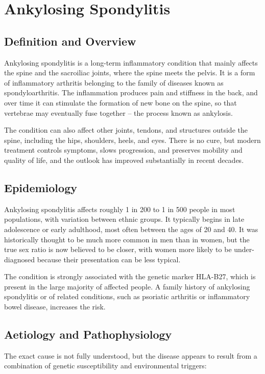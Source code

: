 \chapter{Ankylosing Spondylitis}

\section*{Definition and Overview}
Ankylosing spondylitis is a long-term inflammatory condition that mainly affects the spine and the sacroiliac joints, where the spine meets the pelvis. It is a form of inflammatory arthritis belonging to the family of diseases known as spondyloarthritis. The inflammation produces pain and stiffness in the back, and over time it can stimulate the formation of new bone on the spine, so that vertebrae may eventually fuse together -- the process known as ankylosis.

The condition can also affect other joints, tendons, and structures outside the spine, including the hips, shoulders, heels, and eyes. There is no cure, but modern treatment controls symptoms, slows progression, and preserves mobility and quality of life, and the outlook has improved substantially in recent decades.

\section*{Epidemiology}
Ankylosing spondylitis affects roughly 1 in 200 to 1 in 500 people in most populations, with variation between ethnic groups. It typically begins in late adolescence or early adulthood, most often between the ages of 20 and 40. It was historically thought to be much more common in men than in women, but the true sex ratio is now believed to be closer, with women more likely to be under-diagnosed because their presentation can be less typical.

The condition is strongly associated with the genetic marker HLA-B27, which is present in the large majority of affected people. A family history of ankylosing spondylitis or of related conditions, such as psoriatic arthritis or inflammatory bowel disease, increases the risk.

\section*{Aetiology and Pathophysiology}
The exact cause is not fully understood, but the disease appears to result from a combination of genetic susceptibility and environmental triggers:

